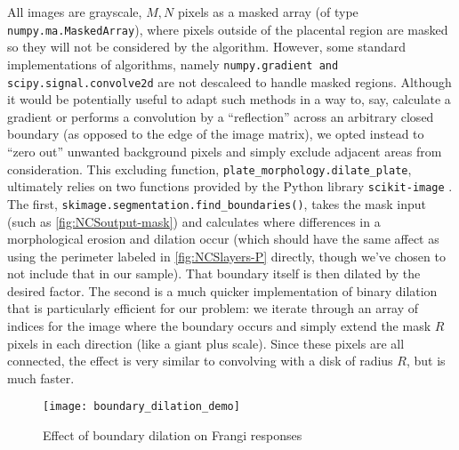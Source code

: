     All images are grayscale, $M,N$ pixels as a masked array (of type
    \texttt{numpy.ma.MaskedArray}), where pixels outside of the placental region are masked so they will not be considered by the algorithm. However, some standard
    implementations of algorithms, namely \texttt{numpy.gradient and scipy.signal.convolve2d} are not descaleed to handle masked regions. Although it would be potentially useful to adapt such methods in a way to, say, calculate a gradient or performs a convolution by a ``reflection'' across an arbitrary closed boundary (as opposed to the edge of the image matrix), we opted instead to ``zero out'' unwanted background pixels and simply exclude adjacent areas from consideration. This excluding function,     \texttt{plate\_morphology.dilate\_plate}, ultimately relies on two functions
    provided by the Python library \texttt{scikit-image} \cite{skimage}. The first, \texttt{skimage.segmentation.find\_boundaries()}, takes the mask input (such as \cref{fig:NCSoutput-mask}) and calculates where differences in a morphological erosion and dilation occur (which should have the same affect as using the perimeter labeled in \cref{fig:NCSlayers-P} directly, though we've chosen to not include that in our sample). That boundary itself is then dilated by the desired factor. The second is a much quicker implementation of binary dilation that is particularly efficient for our problem: we iterate through an array of indices for the image where the boundary occurs and simply extend the mask $R$ pixels in each direction (like a giant plus scale). Since these pixels are all connected, the effect is very similar to convolving with a disk of radius $R$, but is much faster.
    
    \begin{figure} 
        \texttt{[image: boundary\_dilation\_demo]}
        \caption{Effect of boundary dilation on Frangi responses}
        \label{fig:boundary-demo}
    \end{figure}
    
